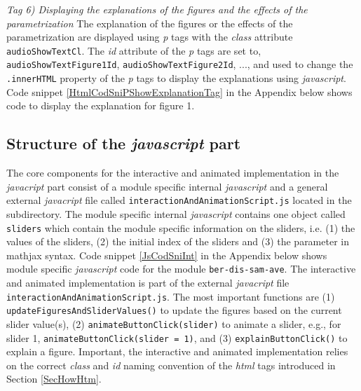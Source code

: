 \documentclass[12pt]{article}
\begin{document}

\vspace{1em}
\noindent\emph{Tag 6) Displaying the explanations of the figures and the effects of the parametrization}
%
The explanation of the figures or the effects of the parametrization are displayed using \emph{p} tags with the \emph{class} attribute \texttt{audioShowTextCl}. 
%
The \emph{id} attribute of the \emph{p} tags are set to, \texttt{audioShowTextFigure1Id}, \texttt{audioShowTextFigure2Id}, ..., and used to change the \texttt{.innerHTML} property of the \emph{p} tags to display the explanations using \emph{javascript}. 
%
Code snippet \ref{HtmlCodSniPShowExplanationTag} in the Appendix below shows code to display the explanation for figure 1. 


\subsection{Structure of the \emph{javascript} part}\label{SecHowJs}

The core components for the interactive and animated implementation in the \emph{javacript} part consist of a module specific internal \emph{javascript} and a general external \emph{javacript} file called \texttt{interactionAndAnimationScript.js} located in the  subdirectory. 
%
The module specific internal \emph{javascript} contains one object called \texttt{sliders} which contain the module specific information on the sliders, i.e. (1) the values of the sliders, (2) the initial index of the sliders and (3) the parameter in mathjax syntax. 
%
Code snippet \ref{JsCodSniInt} in the Appendix below shows module specific \emph{javascript} code for the module \texttt{ber-dis-sam-ave}. 
%
The interactive and animated implementation is part of the external \emph{javacript} file \texttt{interactionAndAnimationScript.js}. 
%
The most important functions are (1) \texttt{updateFiguresAndSliderValues()} to update the figures based on the current slider value(s), (2) \texttt{animateButtonClick(slider)} to animate a slider, e.g., for slider 1, \texttt{animateButtonClick(slider = 1)}, and (3) \texttt{explainButtonClick()} to explain a figure.
%
Important, the interactive and animated implementation relies on the correct \emph{class} and \emph{id} naming convention of the \emph{html} tags introduced in Section \ref{SecHowHtm}.
\end{document}
